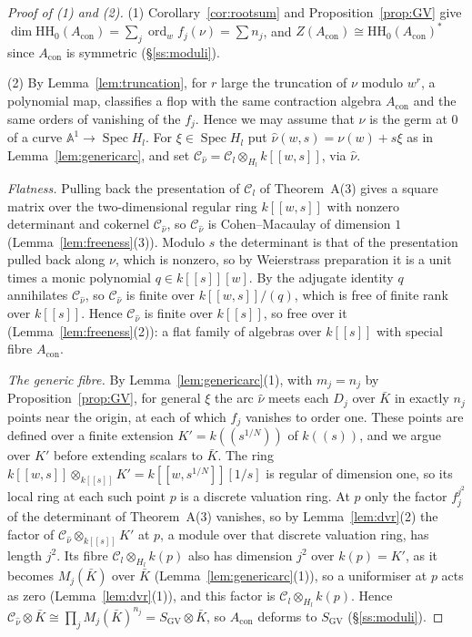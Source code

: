 \documentclass[11pt]{amsart}
\numberwithin{table}{section}
\numberwithin{figure}{section}
\numberwithin{equation}{section}
\theoremstyle{definition}
\theoremstyle{plain}
\newcommand{\Acon}{A_{\mathrm{con}}}
\newcommand{\cC}{\mathcal{C}}
\newcommand{\SGV}{S_{\mathrm{GV}}}
\newcommand{\HH}{\mathrm{HH}}
\DeclareMathOperator{\Spec}{Spec}
\DeclareMathOperator{\ord}{ord}
\begin{document}
\begin{proof}[Proof of (1) and (2)]
(1) Corollary~\ref{cor:rootsum} and Proposition~\ref{prop:GV} give $\dim \HH_0(\Acon) = \sum_j \ord_w f_j(\nu) = \sum n_j$, and $Z(\Acon) \cong \HH_0(\Acon)^*$ since $\Acon$ is symmetric (\S\ref{ss:moduli}).

(2) By Lemma~\ref{lem:truncation}, for $r$ large the truncation of $\nu$ modulo $w^r$, a polynomial map, classifies a flop with the same contraction algebra $\Acon$ and the same orders of vanishing of the $f_j$. Hence we may assume that $\nu$ is the germ at $0$ of a curve $\mathbb{A}^1 \to \Spec H_l$. For $\xi \in \Spec H_l$ put $\hat\nu(w, s) = \nu(w) + s\xi$ as in Lemma~\ref{lem:genericarc}, and set $\cC_{\hat\nu} = \cC_l \otimes_{H_l} k[[w, s]]$, via $\hat\nu$.

\emph{Flatness.} Pulling back the presentation of $\cC_l$ of Theorem~A(3) gives a square matrix over the two-dimensional regular ring $k[[w, s]]$ with nonzero determinant and cokernel $\cC_{\hat\nu}$, so $\cC_{\hat\nu}$ is Cohen--Macaulay of dimension $1$ (Lemma~\ref{lem:freeness}(3)). Modulo $s$ the determinant is that of the presentation pulled back along $\nu$, which is nonzero, so by Weierstrass preparation it is a unit times a monic polynomial $q \in k[[s]][w]$. By the adjugate identity $q$ annihilates $\cC_{\hat\nu}$, so $\cC_{\hat\nu}$ is finite over $k[[w, s]]/(q)$, which is free of finite rank over $k[[s]]$. Hence $\cC_{\hat\nu}$ is finite over $k[[s]]$, so free over it (Lemma~\ref{lem:freeness}(2)): a flat family of algebras over $k[[s]]$ with special fibre $\Acon$.

\emph{The generic fibre.} By Lemma~\ref{lem:genericarc}(1), with $m_j = n_j$ by Proposition~\ref{prop:GV}, for general $\xi$ the arc $\hat\nu$ meets each $D_j$ over $\bar K$ in exactly $n_j$ points near the origin, at each of which $f_j$ vanishes to order one. These points are defined over a finite extension $K' = k((s^{1/N}))$ of $k((s))$, and we argue over $K'$ before extending scalars to $\bar K$. The ring $k[[w, s]] \otimes_{k[[s]]} K' = k[[w, s^{1/N}]][1/s]$ is regular of dimension one, so its local ring at each such point $p$ is a discrete valuation ring. At $p$ only the factor $f_j^{j^2}$ of the determinant of Theorem~A(3) vanishes, so by Lemma~\ref{lem:dvr}(2) the factor of $\cC_{\hat\nu} \otimes_{k[[s]]} K'$ at $p$, a module over that discrete valuation ring, has length $j^2$. Its fibre $\cC_l \otimes_{H_l} k(p)$ also has dimension $j^2$ over $k(p) = K'$, as it becomes $M_j(\bar K)$ over $\bar K$ (Lemma~\ref{lem:genericarc}(1)), so a uniformiser at $p$ acts as zero (Lemma~\ref{lem:dvr}(1)), and this factor is $\cC_l \otimes_{H_l} k(p)$. Hence $\cC_{\hat\nu} \otimes \bar K \cong \prod_j M_j(\bar K)^{n_j} = \SGV \otimes \bar K$, so $\Acon$ deforms to $\SGV$ (\S\ref{ss:moduli}).
\end{proof}
\end{document}

